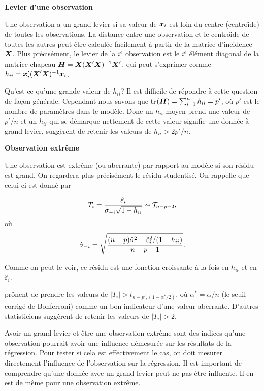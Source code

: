 \textbf{Levier d'une observation}

Une observation a un grand levier si sa valeur de $\mbox{\boldmath$x$\unboldmath}_i$ est loin du centre (centro\"{\i}de) de toutes les observations. La distance entre une observation et le centro\"{\i}de de toutes les autres peut être calculée facilement à partir de la matrice d'incidence $\mbox{\boldmath$X$\unboldmath}$. Plus précisément, le levier de la $i^e$ observation est le $i^e$ élément diagonal de la matrice chapeau $\mbox{\boldmath$H$\unboldmath}=\mbox{\boldmath$X$\unboldmath}(\mbox{\boldmath$X$\unboldmath}'\mbox{\boldmath$X$\unboldmath})^{-1}\mbox{\boldmath$X$\unboldmath}'$, qui peut s'exprimer comme
$h_{ii}=\mbox{\boldmath$x$\unboldmath}_i'(\mbox{\boldmath$X$\unboldmath}'\mbox{\boldmath$X$\unboldmath})^{-1}\mbox{\boldmath$x$\unboldmath}_i$.

Qu'est-ce qu'une grande valeur de $h_{ii}$? Il est difficile de
répondre \`a cette question de fa\c{c}on générale. Cependant nous
savons que tr$(\mbox{\boldmath$H$\unboldmath})=\sum_{i=1}^n h_{ii}=p'$, o\`u $p'$ est le nombre
de paramètres dans le modèle. Donc un $h_{ii}$ moyen prend une valeur de $p'/n$
et un $h_{ii}$ qui se démarque nettement de cette valeur
signifie une donnée \`a grand levier. \citet{Bel_Kuh_Wel:80} suggèrent de retenir les valeurs de $h_{ii}>2p'/n$.

\textbf{Observation extrême}

Une observation est extrême (ou aberrante) par rapport au modèle si son résidu est grand. On regardera plus précisément le résidu studentisé. On rappelle que celui-ci est donné par

$$T_i={\hat\varepsilon_i\over \hat\sigma_{-i}\sqrt{1-h_{ii}}} \sim\mathcal{T}_{n-p-2},$$
o\`u $$\hat\sigma_{-i}=\sqrt{{(n-p)\hat\sigma^2-\hat\varepsilon_i^2/(1-h_{ii})\over n-p-1}}.$$

Comme on peut le voir, ce résidu est une fonction croissante à la fois en
$h_{ii}$ et en $\hat\varepsilon_i$.

\citet{Bel_Kuh_Wel:80} prônent de prendre les valeurs de $|T_i|>t_{n-p',(1-\alpha^*/2)}$, où $\alpha^*=\alpha/n$ (le seuil corrigé de Bonferroni) comme un bon indicateur d'une valeur aberrante. D'autres statisticiens suggèrent de retenir les valeurs de $|T_i|>2$.

\begin{remarque}
Avoir un grand levier et être une observation extrême sont des indices qu'une observation pourrait avoir une influence démesurée sur les résultats de la régression. Pour tester si cela est effectivement le cas, on doit mesurer directement l'influence de l'observation sur la régression. Il est important de comprendre qu'une donnée avec un grand levier peut ne pas être influente. Il en est de même pour une observation extrême.
\end{remarque}


